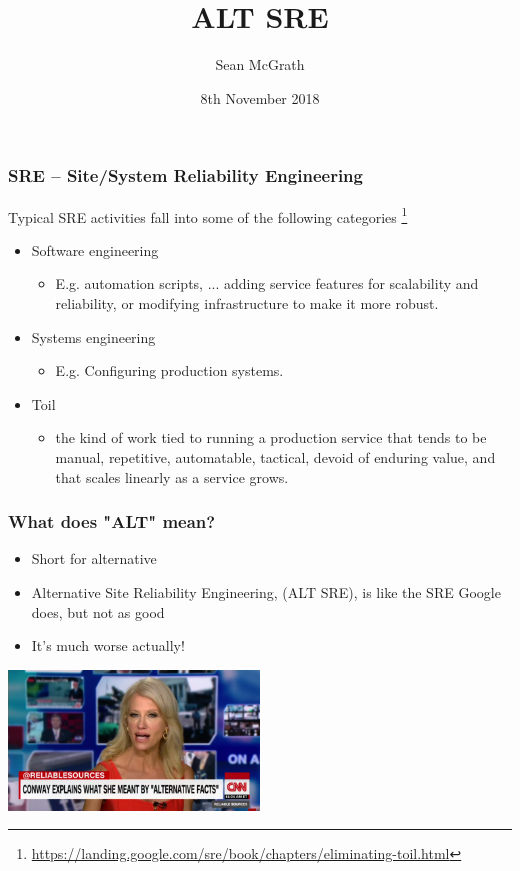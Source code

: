 \documentclass{beamer}
\title[]{ALT SRE}
\author{Sean McGrath}
\institute[TCD]
{
Resarch IT \\
Trinity College Dublin \\
\medskip
\textit{sean.mcgrath@tcd.ie} 
}
\date{8th November 2018}
\begin{document}
\begin{frame}
\titlepage
\end{frame}

\begin{frame}
\frametitle{SRE – Site/System Reliability Engineering}

Typical SRE activities fall into some of the following categories
\footnote{\url{https://landing.google.com/sre/book/chapters/eliminating-toil.html}}

\begin{itemize}
\item Software engineering
	\begin{itemize}
	\item E.g. automation scripts, ... adding service features for scalability and reliability, or modifying infrastructure to make it more robust.
	\end{itemize}
\item Systems engineering
	\begin{itemize}
	\item E.g. Configuring production systems.
	\end{itemize}
\item Toil
	\begin{itemize}
	\item the kind of work tied to running a production service that tends to be manual, repetitive, automatable, tactical, devoid of enduring value, and that scales linearly as a service grows.
	\end{itemize}
\end{itemize}
\end{frame}

\begin{frame}
\frametitle{What does "ALT" mean?}
	\begin{itemize}
	\item Short for alternative
	\item Alternative Site Reliability Engineering, (ALT SRE), is like the SRE Google does, but not as good
	\item It's much worse actually!
	\end{itemize}
    \begin{center}
     \includegraphics[width=0.5\textwidth]{imgs/kellyanne.png}
     \end{center}
\end{frame}
\end{document}
